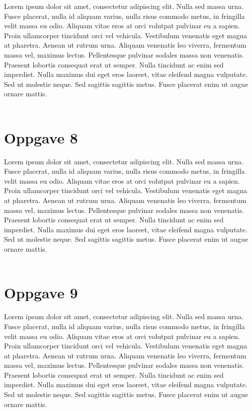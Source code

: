 \documentclass[norsk,a4paper,12pt]{article}
\begin{document}
Lorem ipsum dolor sit amet, consectetur adipiscing elit. Nulla sed massa urna. Fusce placerat, nulla id aliquam varius, nulla risus commodo metus, in fringilla velit massa eu odio. Aliquam vitae eros at orci volutpat pulvinar eu a sapien. Proin ullamcorper tincidunt orci vel vehicula. Vestibulum venenatis eget magna at pharetra. Aenean ut rutrum urna. Aliquam venenatis leo viverra, fermentum massa vel, maximus lectus. Pellentesque pulvinar sodales massa non venenatis. Praesent lobortis consequat erat ut semper. Nulla tincidunt ac enim sed imperdiet. Nulla maximus dui eget eros laoreet, vitae eleifend magna vulputate. Sed ut molestie neque. Sed sagittis sagittis metus. Fusce placerat enim ut augue ornare mattis.
\\
\\

\section*{Oppgave 8}

Lorem ipsum dolor sit amet, consectetur adipiscing elit. Nulla sed massa urna. Fusce placerat, nulla id aliquam varius, nulla risus commodo metus, in fringilla velit massa eu odio. Aliquam vitae eros at orci volutpat pulvinar eu a sapien. Proin ullamcorper tincidunt orci vel vehicula. Vestibulum venenatis eget magna at pharetra. Aenean ut rutrum urna. Aliquam venenatis leo viverra, fermentum massa vel, maximus lectus. Pellentesque pulvinar sodales massa non venenatis. Praesent lobortis consequat erat ut semper. Nulla tincidunt ac enim sed imperdiet. Nulla maximus dui eget eros laoreet, vitae eleifend magna vulputate. Sed ut molestie neque. Sed sagittis sagittis metus. Fusce placerat enim ut augue ornare mattis.
\\
\\

\section*{Oppgave 9}

Lorem ipsum dolor sit amet, consectetur adipiscing elit. Nulla sed massa urna. Fusce placerat, nulla id aliquam varius, nulla risus commodo metus, in fringilla velit massa eu odio. Aliquam vitae eros at orci volutpat pulvinar eu a sapien. Proin ullamcorper tincidunt orci vel vehicula. Vestibulum venenatis eget magna at pharetra. Aenean ut rutrum urna. Aliquam venenatis leo viverra, fermentum massa vel, maximus lectus. Pellentesque pulvinar sodales massa non venenatis. Praesent lobortis consequat erat ut semper. Nulla tincidunt ac enim sed imperdiet. Nulla maximus dui eget eros laoreet, vitae eleifend magna vulputate. Sed ut molestie neque. Sed sagittis sagittis metus. Fusce placerat enim ut augue ornare mattis.
\\
\\
\end{document}
